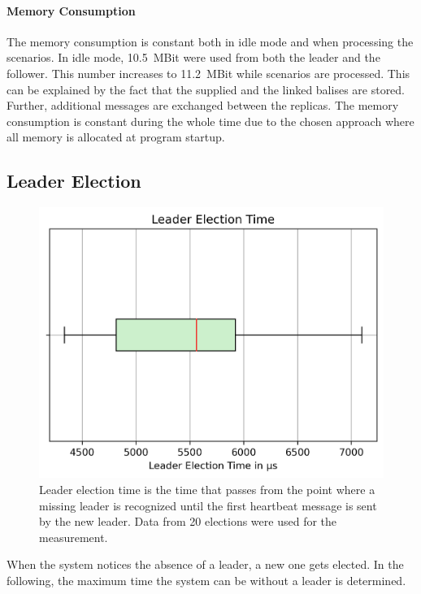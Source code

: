 \paragraph{Memory Consumption}
The memory consumption is constant both in idle mode and when processing the scenarios.
In idle mode, 10.5~MBit were used from both the leader and the follower.
This number increases to 11.2~MBit while scenarios are processed.
This can be explained by the fact that the supplied  and the linked balises are stored.
Further, additional messages are exchanged between the replicas.
The memory consumption is constant during the whole time due to the chosen approach where all memory is allocated at program startup.


\subsection{Leader Election}
\label{subsec:LeaderElectionEval}
\begin{figure}[!htb]
	\centering
	\includegraphics[width=0.8\linewidth]{images/plots/timeWithoutLeader}
	\caption{Leader election time is the time that passes from the point where a missing leader is recognized until the first heartbeat message is sent by the new leader. Data from 20 elections were used for the measurement.}
	\label{fig:PlotTimeWithoutLeader}
\end{figure}

When the system notices the absence of a leader, a new one gets elected.
In the following, the maximum time the system can be without a leader is determined.
\\

